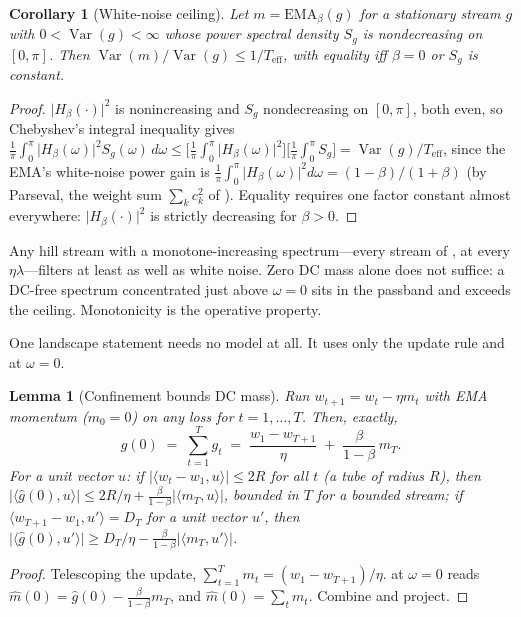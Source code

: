\documentclass[11pt,a4paper]{article}
\newtheorem{lemma}{Lemma}
\newtheorem{corollary}{Corollary}
\theoremstyle{remark}
\newcommand{\Hmag}[1]{\lvert H_\beta(#1)\rvert}
\newcommand{\Teff}{T_{\mathrm{eff}}}
\begin{document}
\begin{corollary}[White-noise ceiling]
\label{cor:ceiling}
Let $m=\mathrm{EMA}_\beta(g)$ for a stationary stream $g$ with $0<\operatorname{Var}(g)<\infty$ whose power spectral density $S_g$ is nondecreasing on $[0,\pi]$.
Then $\operatorname{Var}(m)/\operatorname{Var}(g)\le1/\Teff$, with equality iff $\beta=0$ or $S_g$ is constant.
\end{corollary}

\begin{proof}
$\Hmag{\cdot}^2$ is nonincreasing and $S_g$ nondecreasing on $[0,\pi]$, both even, so Chebyshev's integral inequality gives $\tfrac1\pi\int_0^\pi\Hmag{\omega}^2S_g(\omega)\,d\omega \le\bigl[\tfrac1\pi\int_0^\pi\Hmag{\omega}^2\bigr]\bigl[\tfrac1\pi\int_0^\pi S_g\bigr] =\operatorname{Var}(g)/\Teff$, since the EMA's white-noise power gain is $\tfrac1\pi\int_0^\pi\Hmag{\omega}^2d\omega=(1-\beta)/(1+\beta)$ (by Parseval, the weight sum $\sum_k c_k^2$ of ).
Equality requires one factor constant almost everywhere: $\Hmag{\cdot}^2$ is strictly decreasing for $\beta>0$.
\end{proof}

Any hill stream with a monotone-increasing spectrum---every stream of , at every $\eta\lambda$---filters at least as well as white noise.
Zero DC mass alone does not suffice: a DC-free spectrum concentrated just above $\omega=0$ sits in the passband and exceeds the ceiling.
Monotonicity is the operative property.

One landscape statement needs no model at all.
It uses only the update rule and  at $\omega=0$.

\begin{lemma}[Confinement bounds DC mass]
\label{lem:confinement}
Run $w_{t+1}=w_t-\eta m_t$ with EMA momentum ($m_0=0$) on any loss for $t=1,\dots,T$.
Then, exactly,
\[
\hat g(0)\;=\;\sum_{t=1}^{T}g_t\;=\;\frac{w_1-w_{T+1}}{\eta}\;+\;\frac{\beta}{1-\beta}\,m_T .
\]
For a unit vector $u$: if $\lvert\langle w_t-w_1,u\rangle\rvert\le2R$ for all $t$ (a tube of radius $R$), then $\lvert\langle\hat g(0),u\rangle\rvert\le2R/\eta+\tfrac{\beta}{1-\beta}\lvert\langle m_T,u\rangle\rvert$, bounded in $T$ for a bounded stream; if $\langle w_{T+1}-w_1,u'\rangle=D_T$ for a unit vector $u'$, then $\lvert\langle\hat g(0),u'\rangle\rvert\ge D_T/\eta-\tfrac{\beta}{1-\beta}\lvert\langle m_T,u'\rangle\rvert$.
\end{lemma}

\begin{proof}
Telescoping the update, $\sum_{t=1}^{T}m_t=(w_1-w_{T+1})/\eta$.
 at $\omega=0$ reads $\hat m(0)=\hat g(0)-\tfrac{\beta}{1-\beta}m_T$, and $\hat m(0)=\sum_t m_t$.
Combine and project.
\end{proof}
\end{document}

